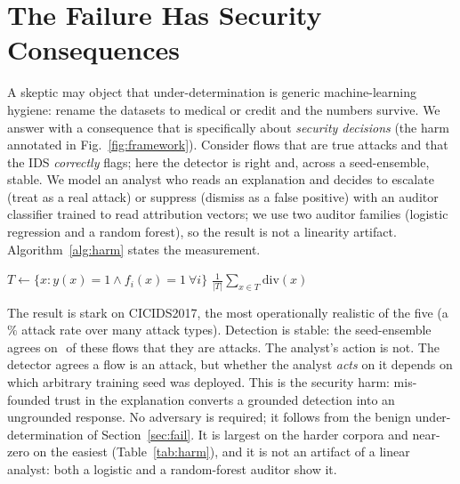 \documentclass[conference]{IEEEtran}
\begin{document}
\section{The Failure Has Security Consequences}\label{sec:harm}
A skeptic may object that under-determination is generic machine-learning hygiene: rename the
datasets to medical or credit and the numbers survive. We answer with a consequence that is
specifically about \emph{security decisions} (the harm annotated in Fig.~\ref{fig:framework}).
Consider flows that are true attacks and that the IDS \emph{correctly} flags; here the detector is
right and, across a seed-ensemble, stable. We model an analyst who reads an explanation and
decides to escalate (treat as a real attack) or suppress (dismiss as a false positive) with an
auditor classifier trained to read attribution vectors; we use two auditor families (logistic
regression and a random forest), so the result is not a linearity artifact. Algorithm~\ref{alg:harm} states the
measurement.

\begin{algorithm}[t]
\caption{Explanation-induced action divergence on true attacks}
\label{alg:harm}
$T \gets \{x : y(x){=}1 \wedge f_i(x){=}1\ \forall i\}$ 
\Return $\frac{1}{|T|}\sum_{x\in T}\mathrm{div}(x)$
\end{algorithm}

The result is stark on CICIDS2017, the most operationally realistic of the five (a
$\%$ attack rate over many attack types). Detection is stable: the
seed-ensemble agrees on $$ of these flows that they are
attacks. The analyst's action is not. The detector agrees a flow is an attack, but whether the
analyst \emph{acts} on it depends on which arbitrary training seed was deployed. This is the
security harm: mis-founded trust in the explanation converts a grounded detection into an
ungrounded response. No adversary is required; it follows from the benign under-determination of
Section~\ref{sec:fail}. It is largest on the harder corpora and near-zero on the easiest
(Table~\ref{tab:harm}), and it is not an artifact of a linear analyst: both a
logistic and a random-forest auditor show it.
\end{document}
